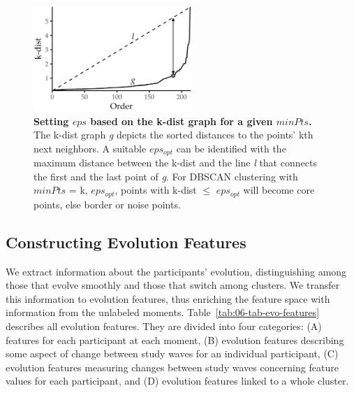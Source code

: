 \documentclass[
  oneside]{book}
\begin{document}
\begin{figure}[htb]

{\centering \includegraphics[width=6cm]{figures/06-k-dist-graph} 

}

\caption{\textbf{Setting \(eps\) based on the k-dist graph for a given \(minPts\).} The k-dist graph \emph{g} depicts the sorted distances to the points' kth next neighbors. A suitable \(eps_{opt}\) can be identified with the maximum distance between the k-dist and the line \emph{l} that connects the first and the last point of \emph{g}. For DBSCAN clustering with \(minPts\) = k, \(eps_{opt}\), points with k-dist \(\leq\) \(eps_{opt}\) will become core points, else border or noise points.}\label{fig:06-k-dist-graph}
\end{figure}

\hypertarget{evo-concept-evo-features}{%
\subsection{Constructing Evolution Features}\label{evo-concept-evo-features}}

We extract information about the participants' evolution, distinguishing among those that evolve smoothly and those that switch among clusters.
We transfer this information to evolution features, thus enriching the feature space with information from the unlabeled moments.
Table~\ref{tab:06-tab-evo-features} describes all evolution features.
They are divided into four categories: (A) features for each participant at each moment, (B) evolution features describing some aspect of change between study waves for an individual participant, (C) evolution features measuring changes between study waves concerning feature values for each participant, and (D) evolution features linked to a whole cluster.
\end{document}
